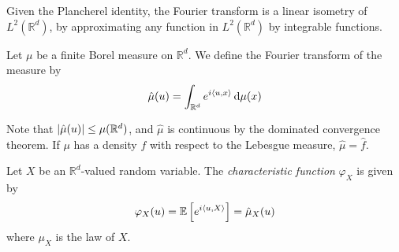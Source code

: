 \begin{remark}
	Given the Plancherel identity, the Fourier transform is a linear isometry of \( L^2(\mathbb R^d) \), by approximating any function in \( L^2(\mathbb R^d) \) by integrable functions.
\end{remark}
\begin{definition}
	Let \( \mu \) be a finite Borel measure on \( \mathbb R^d \).
	We define the Fourier transform of the measure by
	\[ \hat\mu(u) = \int_{\mathbb R^d} e^{i\left\langle{u,x}\right\rangle} \dd{\mu(x)} \]
\end{definition}
Note that \( \abs{\hat \mu(u)} \leq \mu(\mathbb R^d) \), and \( \hat \mu \) is continuous by the dominated convergence theorem.
If \( \mu \) has a density \( f \) with respect to the Lebesgue measure, \( \hat\mu = \hat f \).
\begin{definition}
	Let \( X \) be an \( \mathbb R^d \)-valued random variable.
	The \emph{characteristic function} \( \varphi_X \) is given by
	\[ \varphi_X(u) = \mathbb{E}\left[{e^{i\left\langle{u,X}\right\rangle}}\right] = \hat \mu_X(u) \]
	where \( \mu_X \) is the law of \( X \).
\end{definition}

